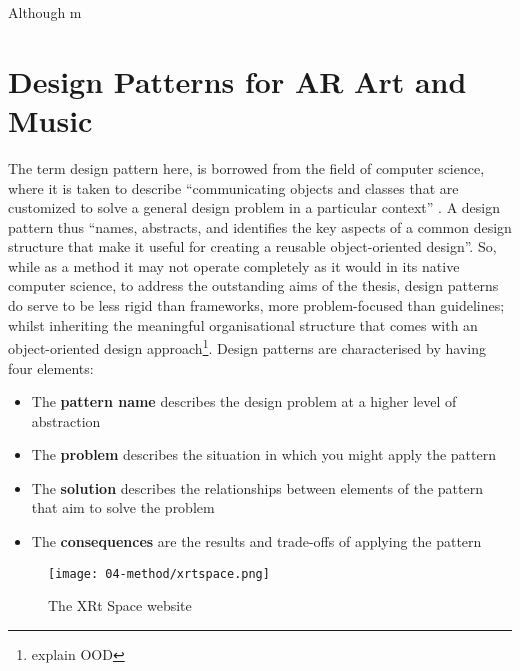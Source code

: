 Although m





\section{Design Patterns for AR Art and Music} \label{sec: method-patterns} %

The term design pattern here, is borrowed from the field of computer science, where it is taken to describe ``communicating objects and classes that are customized to solve a general design problem in a particular context'' \citep{gamma1995}. A design pattern thus ``names, abstracts, and identifies the key aspects of a common design structure that make it useful for creating a reusable object-oriented design''. So, while as a method it may not operate completely as it would in its native computer science, to address the outstanding aims of the thesis, design patterns do serve to be less rigid than frameworks, more problem-focused than guidelines; whilst inheriting the meaningful organisational structure that comes with an object-oriented design approach\footnote{explain OOD}. Design patterns are characterised by having four elements:
\begin{itemize}
    \item The \textbf{pattern name} describes the design problem at a higher level of abstraction
    \item The \textbf{problem} describes the situation in which you might apply the pattern
    \item The \textbf{solution} describes the relationships between elements of the pattern that aim to solve the problem
    \item The \textbf{consequences} are the results and trade-offs of applying the pattern
\end{itemize}

\begin{figure}
    \centering
    {\texttt{[image: 04-method/xrtspace.png]}}
    \caption[The XRt Space website]{The XRt Space website}
\end{figure}\label{fig: thexrtspace}

